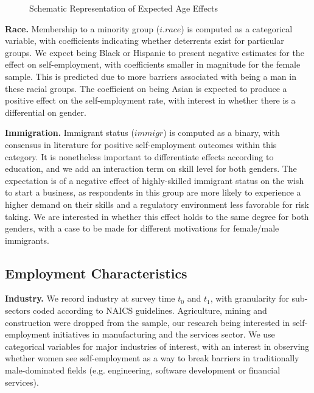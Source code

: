 \begin{figure}[hbtp]
    \caption{Schematic Representation of Expected Age Effects} 
\end{figure}

\textbf{Race.} Membership to a minority group ($i.race$) is computed as a categorical variable, with coefficients indicating whether deterrents exist for particular groups. We expect being Black or Hispanic to present negative estimates for the effect on self-employment, with coefficients smaller in magnitude for the female sample. This is predicted due to more barriers associated with being a man in these racial groups. The coefficient on being Asian is expected to produce a positive effect on the self-employment rate, with interest in whether there is a differential on gender. 


\textbf{Immigration.} Immigrant status ($immigr$) is computed as a binary, with consensus in literature for positive self-employment outcomes within this category. It is nonetheless important to differentiate effects according to education, and we add an interaction term on skill level for both genders. The expectation is of a negative effect of highly-skilled immigrant status on the wish to start a business, as respondents in this group are more likely to experience a higher demand on their skills and a regulatory environment less favorable for risk taking. We are interested in whether this effect holds to the same degree for both genders, with a case to be made for different motivations for female/male immigrants. 


\subsection{Employment Characteristics}

\textbf{Industry.} We record industry at survey time $t_0$ and $t_1$, with granularity for sub-sectors coded according to NAICS guidelines. Agriculture, mining and construction were dropped from the sample, our research being interested in self-employment initiatives in manufacturing and the services sector. We use categorical variables for major industries of interest, with an interest in observing whether women see self-employment as a way to break barriers in traditionally male-dominated fields (e.g. engineering, software development or financial services).

